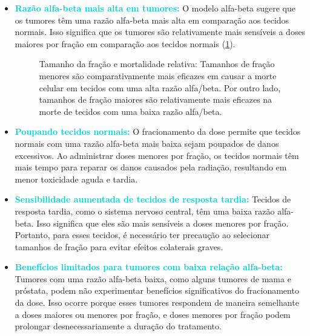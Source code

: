 \documentclass[11pt,a4paper]{article}
\begin{document}
	\begin{itemize}
		\item \textcolor{DarkTurquoise}{\textbf{Razão alfa-beta mais alta em tumores:}} O modelo alfa-beta sugere que os tumores têm uma razão alfa-beta mais alta em comparação aos tecidos normais. Isso significa que os tumores são relativamente mais sensíveis a doses maiores por fração em comparação aos tecidos normais (\ref{fig:fracionamentoEMorteCelular}).
		
		\begin{figure}[h]
			\centering
			\caption{Tamanho da fração e mortalidade relativa: Tamanhos de fração menores são comparativamente mais eficazes em causar a morte celular em tecidos com uma alta razão alfa/beta. Por outro lado, tamanhos de fração maiores são relativamente mais eficazes na morte de tecidos com uma baixa razão alfa/beta.}
			\label{fig:fracionamentoEMorteCelular}
		\end{figure}

		\item \textcolor{DarkTurquoise}{\textbf{Poupando tecidos normais:}} O fracionamento da dose permite que tecidos normais com uma razão alfa-beta mais baixa sejam poupados de danos excessivos. Ao administrar doses menores por fração, os tecidos normais têm mais tempo para reparar os danos causados pela radiação, resultando em menor toxicidade aguda e tardia.

		\item \textcolor{DarkTurquoise}{\textbf{Sensibilidade aumentada de tecidos de resposta tardia:}} Tecidos de resposta tardia, como o sistema nervoso central, têm uma baixa razão alfa-beta. Isso significa que eles são mais sensíveis a doses menores por fração. Portanto, para esses tecidos, é necessário ter precaução ao selecionar tamanhos de fração para evitar efeitos colaterais graves.

		\item \textcolor{DarkTurquoise}{\textbf{Benefícios limitados para tumores com baixa relação alfa-beta:}} Tumores com uma razão alfa-beta baixa, como alguns tumores de mama e próstata, podem não experimentar benefícios significativos do fracionamento da dose. Isso ocorre porque esses tumores respondem de maneira semelhante a doses maiores ou menores por fração, e doses menores por fração podem prolongar desnecessariamente a duração do tratamento.
	\end{itemize}
\end{document}
